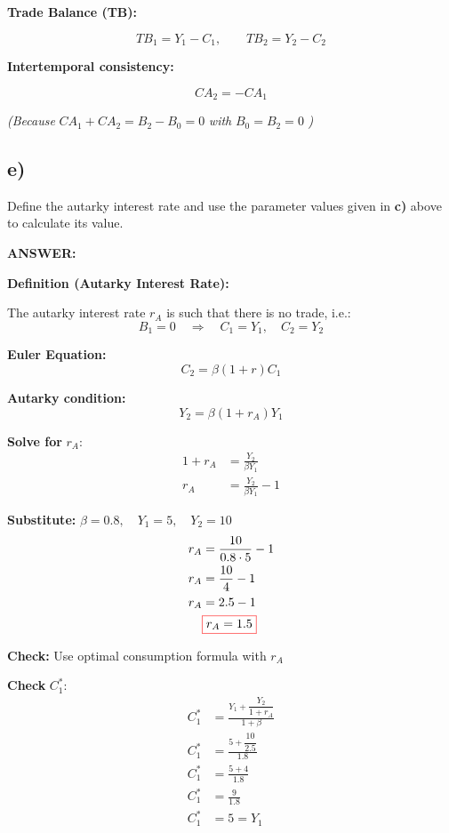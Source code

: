 \documentclass[12pt]{article}
\begin{document}
\vspace{1em}
\textbf{Trade Balance (TB):}

\[
TB_1 = Y_1 - C_1, \qquad TB_2 = Y_2 - C_2
\]

\vspace{1em}
\textbf{Intertemporal consistency:}

\[
CA_2 = -CA_1
\]

\textit{(Because } \( CA_1 + CA_2 = B_2 - B_0 = 0 \) \textit{ with } \( B_0 = B_2 = 0 \) \textit{)}


\subsection*{\noindent\textbf{e)}}

Define the autarky interest rate and use the parameter values given in \textbf{c)} above to
calculate its value.

\vspace{0.5em}
\noindent\textcolor{formalred}{\textbf{ANSWER:}}

\textbf{Definition (Autarky Interest Rate):}

The autarky interest rate \( r_A \) is such that there is no trade, i.e.:
\[
B_1 = 0 \quad \Rightarrow \quad C_1 = Y_1, \quad C_2 = Y_2
\]

\textbf{Euler Equation:}
\[
C_2 = \beta(1 + r)C_1
\]

\textbf{Autarky condition:}
\[
Y_2 = \beta(1 + r_A)Y_1
\]

\textbf{Solve for } \( r_A \):
\begin{align*}
1 + r_A &= \frac{Y_2}{\beta Y_1} \\
r_A &= \frac{Y_2}{\beta Y_1} - 1
\end{align*}

\textbf{Substitute: } \( \beta = 0.8, \quad Y_1 = 5, \quad Y_2 = 10 \)
\begin{align*}
r_A &= \frac{10}{0.8 \cdot 5} - 1 \\
r_A &= \frac{10}{4} - 1 \\
r_A &= 2.5 - 1 \\
&\fcolorbox{red}{white}{$\displaystyle r_A = 1.5$}
\end{align*}

\vspace{1em}
\textbf{Check:} Use optimal consumption formula with \( r_A \)

\textbf{Check } \( C_1^* \):
\begin{align*}
C_1^* &= \frac{Y_1 + \dfrac{Y_2}{1 + r_A}}{1 + \beta} \\
C_1^* &= \frac{5 + \dfrac{10}{2.5}}{1.8} \\
C_1^* &= \frac{5 + 4}{1.8} \\
C_1^* &= \frac{9}{1.8} \\
C_1^* &= 5 = Y_1
\end{align*}
\end{document}
